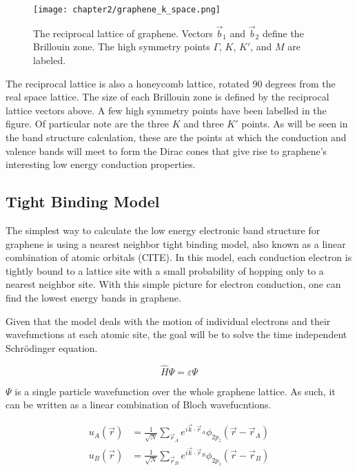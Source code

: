 \begin{figure}
    \centering
    \texttt{[image: chapter2/graphene\_k\_space.png]}
    \caption{The reciprocal lattice of graphene. Vectors $\vec{b}_1$ and $\vec{b}_2$ define the Brillouin zone. The high symmetry points $\Gamma$, $K$, $K'$, and $M$ are labeled.}
    \label{fig:graphene_k_space}
\end{figure}

The reciprocal lattice is also a honeycomb lattice, rotated 90 degrees from the real space lattice. The size of each Brillouin zone is defined by the reciprocal lattice vectors above. A few high symmetry points have been labelled in the figure. Of particular note are the three $K$ and three $K'$ points. As will be seen in the band structure calculation, these are the points at which the conduction and valence bands will meet to form the Dirac cones that give rise to graphene's interesting low energy conduction properties.

\subsection{Tight Binding Model}

The simplest way to calculate the low energy electronic band structure for graphene is using a nearest neighbor tight binding model, also known as a linear combination of atomic orbitals (CITE). In this model, each conduction electron is tightly bound to a lattice site with a small probability of hopping only to a nearest neighbor site. With this simple picture for electron conduction, one can find the lowest energy bands in graphene.

Given that the model deals with the motion of individual electrons and their wavefunctions at each atomic site, the goal will be to solve the time independent Schr\"{o}dinger equation.

\begin{equation}
    \hat{H}\Psi = \varepsilon\Psi
\end{equation}

$\Psi$ is a single particle wavefunction over the whole graphene lattice. As such, it can be written as a linear combination of Bloch wavefucntions.

\begin{align}
    u_A(\vec{r}) &= \frac{1}{\sqrt{N}}\sum_{\vec{r}_A}^{} e^{i\vec{k}\cdot\vec{r}_A} \phi_{2p_z}(\vec{r}-\vec{r}_A) \\
    u_B(\vec{r}) &= \frac{1}{\sqrt{N}}\sum_{\vec{r}_B}^{} e^{i\vec{k}\cdot\vec{r}_B} \phi_{2p_z}(\vec{r}-\vec{r}_B)
\end{align}

